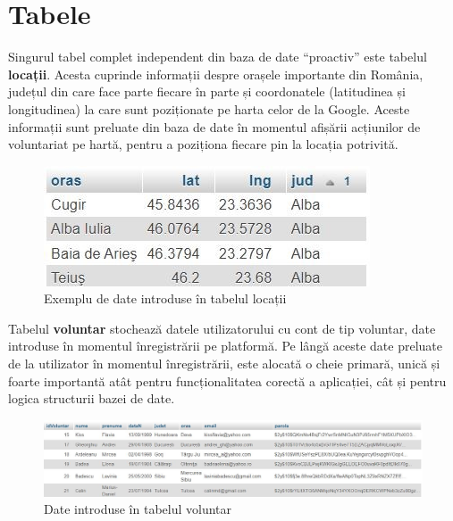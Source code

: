 \documentclass[12pt,a4paper]{report}
\begin{document}
\section{Tabele}
\par
Singurul tabel complet independent din baza de date “proactiv” este tabelul \textbf{locații}. Acesta cuprinde informații despre orașele importante din România, județul din care face parte fiecare în parte și coordonatele (latitudinea și longitudinea) la care sunt poziționate pe harta celor de la Google. Aceste informații sunt preluate din baza de date în momentul afișării acțiunilor de voluntariat pe hartă, pentru a poziționa fiecare pin la locația potrivită.
\\
\begin{figure}[H]
\centering
  \includegraphics[width=0.6\linewidth]{./imagini/locatii.jpg}
  \caption{Exemplu de date introduse în tabelul locații}
\end{figure}

Tabelul \textbf{voluntar} stochează datele utilizatorului cu cont de tip voluntar, date introduse în momentul înregistrării pe platformă. Pe lângă aceste date preluate de la utilizator în momentul înregistrării, este alocată o cheie primară, unică și foarte importantă atât pentru funcționalitatea corectă a aplicației, cât și pentru logica structurii bazei de date.
\\
\begin{figure}[H]
\centering
  \includegraphics[width=1\linewidth]{./imagini/voluntar.jpg}
  \caption{Date introduse în tabelul voluntar}
\end{figure}


\newpage
\end{document}
